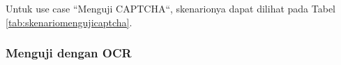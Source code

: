 
Untuk use case \textquotedblleft Menguji CAPTCHA\textquotedblleft, skenarionya dapat dilihat pada Tabel \ref{tab:skenariomengujicaptcha}.

\subsubsection{Menguji dengan OCR}

